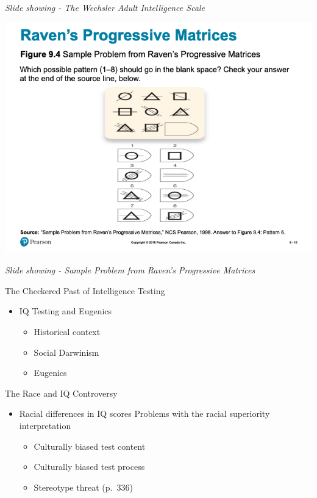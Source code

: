 \documentclass[
]{book}
\providecommand{\tightlist}{%
  \setlength{\itemsep}{0pt}\setlength{\parskip}{0pt}}
\begin{document}
\begin{reflect}
\emph{Slide showing - The Wechsler Adult Intelligence Scale}

\includegraphics{assets/unit_2/slide_15.png}

\emph{Slide showing - Sample Problem from Raven's Progressive Matrices}

The Checkered Past of Intelligence Testing

\begin{itemize}
\tightlist
\item
  IQ Testing and Eugenics

  \begin{itemize}
  \tightlist
  \item
    Historical context\\
  \item
    Social Darwinism\\
  \item
    Eugenics
  \end{itemize}
\end{itemize}

The Race and IQ Controversy

\begin{itemize}
\tightlist
\item
  Racial differences in IQ scores Problems with the racial superiority interpretation

  \begin{itemize}
  \tightlist
  \item
    Culturally biased test content\\
  \item
    Culturally biased test process\\
  \item
    Stereotype threat (p.~336)
  \end{itemize}
\end{itemize}


\end{reflect}
\end{document}

